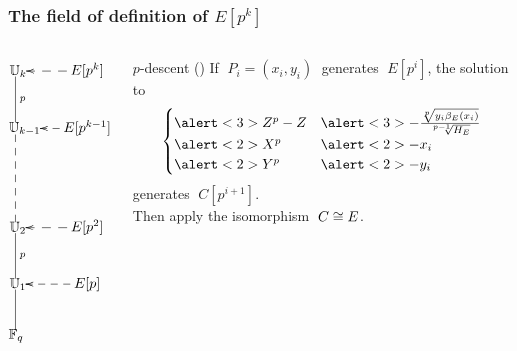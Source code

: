 \documentclass[10pt]{beamer}
\begin{document}
\begin{frame}
  \frametitle{The field of definition of $E[p^k]$}
  
  \begin{columns}
    \begin{column}{0.3\textwidth}
      \large\[\xymatrix@C=20pt{
        *[r]{\U_k} \ar@{-}[d]^p & E[p^k] \ar@{-->}[l]\\
        *[r]{\U_{k-1}} \ar@{--}[dd] & E[p^{k-1}] \ar@{-->}[l]\\
        \\
        *[r]{\U_2} \ar@{-}[d]^p & E[p^2] \ar@{-->}[l]\\
        *[r]{\U_1} \ar@{-}[d] & E[p] \ar@{-->}[l]\\
        *[r]{\F_q}
      }\]
    \end{column}
    \begin{column}{0.65\textwidth}
      \begin{center}
      \end{center}
      \begin{block}{$p$-descent (\cite{voloch90})}
        If $\;P_i=(x_i,y_i)\;$ generates $\;E[p^i]$, the solution to
        \begin{equation*}
          \begin{cases}
            \alert<3>{Z^p - Z} &\alert<3>{- \frac{\sqrt[p]{y_i\beta_E(x_i)}}{\sqrt[p-1]{H_E}}}\\
            \alert<2>{X^p} &\alert<2>{- x_i}\\
            \alert<2>{Y^p} &\alert<2>{- y_i}
          \end{cases}
        \end{equation*}
        generates $\;C[p^{i+1}]$.\\
        \alert<4>{Then apply the isomorphism $\;C\cong E$}.
      \end{block}
    \end{column}
  \end{columns}
\end{frame}
\end{document}
